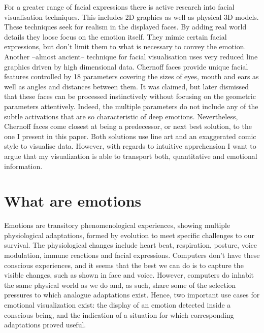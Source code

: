 For a greater range of facial expressions there is active research into facial visualisation techniques.
This includes 2D graphics\cite{parametric_face_facs, FACSGen} as well as physical 3D models\cite{FARAJ2021e00117}.
These techniques seek for realism in the displayed faces. By adding real world details they loose focus on the emotion itself.
They mimic certain facial expressions, but don't limit them to what is necessary to convey the emotion.
Another --almost ancient-- technique for facial visualisation uses very reduced line graphics
driven by high dimensional data\cite{chernoff}. Chernoff faces provide unique facial features controlled by 18 parameters covering the
sizes of eyes, mouth and ears as well as angles and distances between them. It was claimed, but later dismissed
that these faces can be processed instinctively without focusing on the geometric parameters attentively\cite{chernoff_analysis}.
Indeed, the multiple parameters do not include any of the subtle activations that are so characteristic of deep emotions.
Nevertheless, Chernoff faces come closest at being a predecessor, or next best solution, to the one I present in this paper.
Both solutions use line art and an exaggerated comic style to visualise data. However, with regards to intuitive
apprehension I want to argue that my visualization is able to transport both, quantitative and emotional information.


\section{What are emotions}

Emotions are transitory phenomenological experiences, showing multiple physiological adaptations,
formed by evolution to meet specific challenges to our survival\cite{Russell2009,Scarantino2012}.
The physiological changes include heart beat, respiration, posture, voice modulation, immune reactions and facial expressions.
Computers don't have these conscious experiences, and it seems that the best we can do is to capture
the visible changes, such as shown in face and voice. However, computers do inhabit the same physical world as we do and,
as such, share some of the selection pressures to which analogue adaptations exist. Hence, two important use
cases for emotional visualization exist: the display of an emotion detected inside a conscious being, and
the indication of a situation for which corresponding adaptations proved useful.

